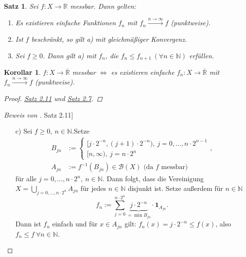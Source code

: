 \documentclass[a4paper]{report}
\newcommand{\doubleOne}{\textbf{1}}
\newcommand{\R}{\mathbb{R}}
\newcommand{\Rq}{\overline{\R}}
\newcommand{\N}{\mathbb{N}}
\newcommand{\Borel}{\mathcal{B}}
\newcommand{\jlabel}[1]{\label{j_#1}}
\newcommand{\jhyperref}[2]{\hyperref[j_#1]{#2}}
\newcommand{\jlink}[1]{\jhyperref{#1}{#1}}
\newcommand{\jabb}[3]{ #1: #2 \rightarrow #3 }
\theoremstyle{plain}
\newtheorem{satz}[thm]{Satz}
\newtheorem{kor}[thm]{Korollar}
\theoremstyle{definition}
\begin{document}
{{{\begin{satz}
\jlabel{Satz 2.11}
    Sei $\jabb{f}{X}{\R}$ messbar. Dann gelten:
    \begin{enumerate}
        \item Es existieren einfache Funktionen $f_n$ mit $f_n \xrightarrow{n\rightarrow\infty} f$ (punktweise).
        \item Ist $f$ beschränkt, so gilt a) mit gleichmäßiger Konvergenz.
        \item Sei $f\ge 0$. Dann gilt a) mit $f_n$, die $f_n \le f_{n+1} \ (\forall n\in\N)$ erfüllen.
    \end{enumerate}

\end{satz}

\begin{kor}
\jlabel{Kor 2.12}
    $\jabb{f}{X}{\Rq}$ messbar $\Leftrightarrow$ es existieren einfache $\jabb{f_n}{X}{\Rq}$ mit $f_n \xrightarrow{n\rightarrow \infty} f$ (punktweise).
    \begin{proof}
        \jlink{Satz 2.11} und \jlink{Satz 2.7}.
    \end{proof}
\end{kor}

\begin{proof}[Beweis von \jlink{Satz 2.11}]
    \begin{itemize}
        \item[c)] Sei $f\ge 0, \ n\in\N$.Setze
        \begin{displaymath}
            \begin{split}
                B_{jn} &:= \begin{cases} [j\cdot 2^{-n}, (j+1)\cdot 2^{-n}), \ j=0,\dots, n\cdot 2^{n-1} \\ [n, \infty), \ j = n\cdot 2^n \end{cases},\\
                A_{jn} &:= f^{-1}(B_{jn}) \in \Borel(X) \text{ (da $f$ messbar)}
            \end{split}
        \end{displaymath}
        für alle $j=0,\dots,n\cdot 2^n,\ n\in\N$. Dann folgt, dass die Vereinigung $X = \bigcup_{j=0,\dots,n\cdot 2^n} A_{jn}$ für jedes $n\in\N$ disjunkt ist. Setze außerdem für $n\in\N$
        \begin{displaymath}
            f_n := \sum_{j=0}^{n\cdot 2^n} \underbrace{j\cdot 2^{-n}}_{= \min B_{jn}} \cdot \doubleOne_{A_{jn}}.
        \end{displaymath}
        Dann ist $f_n$ einfach und für $x\in A_{jn}$ gilt: $f_n(x) = j\cdot 2^{-n} \le f(x)$, also $f_n \le f \ \forall n\in\N$.
        

\end{itemize}
\end{proof}}}}
\end{document}
